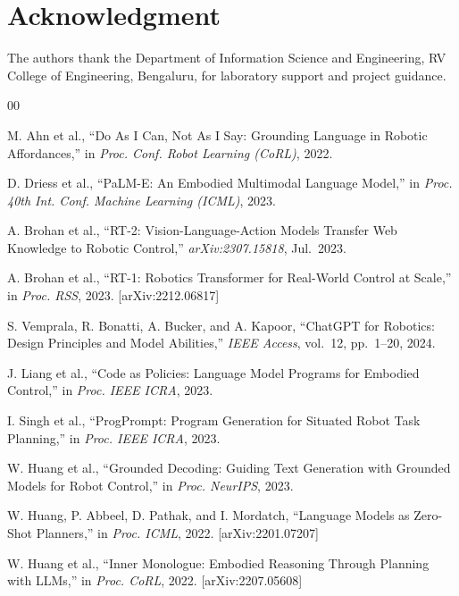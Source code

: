 \documentclass[conference]{IEEEtran}
\begin{document}
\section*{Acknowledgment}

The authors thank the Department of Information Science and Engineering, RV College of Engineering, Bengaluru, for laboratory support and project guidance.

\begin{thebibliography}{00}

M. Ahn et al.,
``Do As I Can, Not As I Say: Grounding Language in Robotic Affordances,''
in \textit{Proc. Conf. Robot Learning (CoRL)}, 2022.

D. Driess et al.,
``PaLM-E: An Embodied Multimodal Language Model,''
in \textit{Proc. 40th Int. Conf. Machine Learning (ICML)}, 2023.

A. Brohan et al.,
``RT-2: Vision-Language-Action Models Transfer Web Knowledge to
Robotic Control,'' \textit{arXiv:2307.15818}, Jul.\ 2023.

A. Brohan et al.,
``RT-1: Robotics Transformer for Real-World Control at Scale,''
in \textit{Proc. RSS}, 2023. [arXiv:2212.06817]

S. Vemprala, R. Bonatti, A. Bucker, and A. Kapoor,
``ChatGPT for Robotics: Design Principles and Model Abilities,''
\textit{IEEE Access}, vol.~12, pp.~1--20, 2024.

J. Liang et al.,
``Code as Policies: Language Model Programs for Embodied Control,''
in \textit{Proc. IEEE ICRA}, 2023.

I. Singh et al.,
``ProgPrompt: Program Generation for Situated Robot Task Planning,''
in \textit{Proc. IEEE ICRA}, 2023.

W. Huang et al.,
``Grounded Decoding: Guiding Text Generation with Grounded Models for
Robot Control,'' in \textit{Proc. NeurIPS}, 2023.

W. Huang, P. Abbeel, D. Pathak, and I. Mordatch,
``Language Models as Zero-Shot Planners,''
in \textit{Proc. ICML}, 2022. [arXiv:2201.07207]

W. Huang et al.,
``Inner Monologue: Embodied Reasoning Through Planning with LLMs,''
in \textit{Proc. CoRL}, 2022. [arXiv:2207.05608]


\end{thebibliography}
\end{document}
